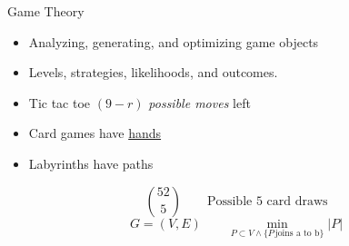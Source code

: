 \documentclass[compress]{beamer}
\newcommand{\blue}[1]{\textcolor{NordBlue}{#1}}
\newcommand{\red}[1]{\textcolor{NordRed}{#1}}
\newcommand{\magenta}[1]{\textcolor{NordMagenta}{#1}}
\newcommand{\cyan}[1]{\textcolor{NordCyan}{#1}}
\begin{document}
\begin{frame}{Game Theory}

\begin{itemize}
    \item \cyan{Analyzing}, \blue{generating}, and \magenta{optimizing} \blue{game objects}
    \item Levels, strategies, likelihoods, and outcomes.
\end{itemize}

\bigskip

\begin{itemize}
        \item \blue{Tic tac toe}  $(9 - r)$ \red{\it possible moves} left
        \item \blue{Card} games have \href{https://en.wikipedia.org/wiki/Standard\_52-card\_deck\#Combinations}{\red{hands}}
    \item \blue{Labyrinths} have \red{paths}
\end{itemize}

\medskip
\begin{center}
\textcolor{black}{\Huge {}     }
\end{center}
\[ { 52 \choose 5} \qquad \text{Possible 5 card draws}\]
\medskip
\[G = (V,E) \qquad \min_{P\subset V \land \{ P \, \text{joins a to b} \} } |P|\]

\end{frame}
\end{document}
